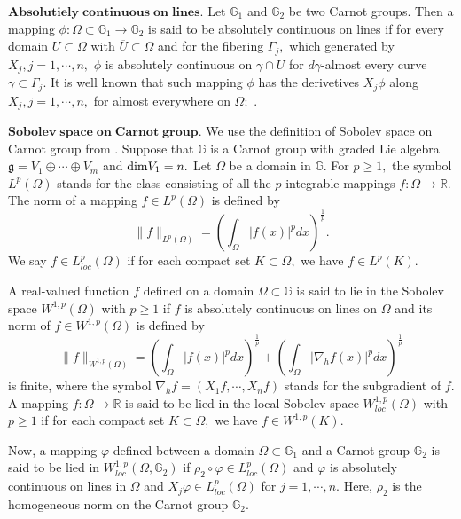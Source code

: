 \documentclass[11pt,twoside]{article}
\theoremstyle{definition}
\theoremstyle{remark}
\begin{document}
$\mathbf{Absolutiely\;continuous\;on\;lines}.$  Let $\mathbb{G}_{1}$ and $\mathbb{G}_{2}$ be two Carnot groups. Then a mapping $\phi:\Omega\subset\mathbb{G}_{1}\rightarrow\mathbb{G}_{2}$ is said to be absolutely continuous on lines if for every domain $U\subset\Omega$ with $\overline{U}\subset\Omega$ and for the fibering $\Gamma_{j},$ which generated by $X_{j},j=1,\cdots,n,$ $\phi$ is absolutely continuous on $\gamma\cap U$ for 
$d\gamma$-almost every curve $\gamma\subset\Gamma_{j}.$ It is well known that such mapping $\phi$ has the derivetives $X_{j}\phi$ along $X_{j},j=1,\cdots,n,$ for almost everywhere on $\Omega;$ \cite[Proposition 4.1]{Pan89}. 

$\mathbf{Sobolev\;space\;on\;Carnot\;group}.$  
We use the definition of Sobolev space on Carnot group from \cite{Vod23}. Suppose that $\mathbb{G}$ is a Carnot group with graded Lie algebra $\mathfrak{g}=V_{1}\oplus\cdots\oplus V_{m}$ and ${\rm dim}V_{1}=n.$
Let $\Omega$ be a domain in $\mathbb{G}.$ For $p\geq1,$ the symbol $L^{p}(\Omega)$ stands for the class consisting of all the $p$-integrable mappings 
$f:\Omega\rightarrow\mathbb{R}.$ The norm of a mapping $f\in L^{p}(\Omega)$ is defined by 
$$\| f\|_{L^{p}(\Omega)}=\left(\int_{\Omega}\vert f(x)\vert^{p}dx\right)^{\frac{1}{p}}.$$
We say $f\in L_{loc}^{p}(\Omega)$ if for each compact set $K\subset\Omega,$ we have $f\in L^{p}(K).$


 A real-valued function $f$ defined on a domain $\Omega\subset\mathbb{G}$  is said to lie in the Sobolev space $W^{1,p}(\Omega)$ with $p\geq1$ if $f$ is absolutely continuous on lines on $\Omega$ and its norm of $f\in W^{1,p}(\Omega)$ is defined by 
 $$\| f\|_{W^{1,p}(\Omega)}=\left(\int_{\Omega}\vert f(x)\vert^{p}dx\right)^{\frac{1}{p}}+\left(\int_{\Omega}\vert \nabla_{h}f(x)\vert^{p}dx\right)^{\frac{1}{p}}$$
is finite, where the symbol  $\nabla_{h}f=(X_{1}f,\cdots,X_{n}f)$ stands for the subgradient of $f.$ A mapping $f:\Omega\rightarrow \mathbb{R}$ is said to be lied in the local Sobolev space $W_{loc}^{1,p}(\Omega)$ with $p\geq1$ if  for each compact set $K\subset\Omega,$ we have $f\in W^{1,p}(K).$


Now, a mapping $\varphi$ defined between a domain $\Omega\subset \mathbb{G}_{1}$ and a Carnot group $\mathbb{G}_{2}$ is said to be lied in $W_{loc}^{1,p}(\Omega,\mathbb{G}_{2})$ if $\rho_{2}\circ\varphi\in L_{loc}^{p}(\Omega)$ and $\varphi$ is absolutely continuous on lines in $\Omega$ and $X_{j}\varphi\in L_{loc}^{p}(\Omega)$ for $j=1,\cdots,n.$ Here, $\rho_{2}$ is the homogeneous norm on the Carnot group $\mathbb{G}_{2}.$
\end{document}

